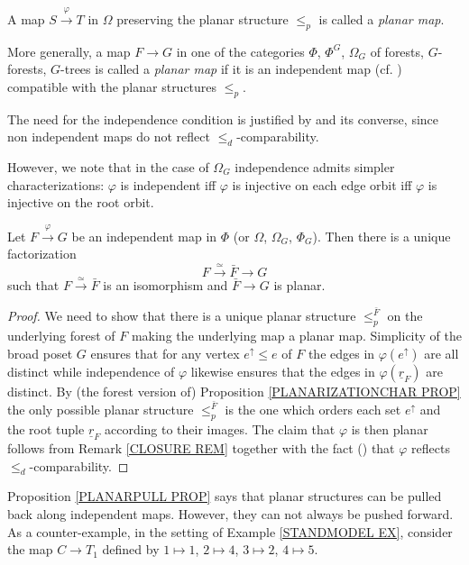 \documentclass[a4paper,10pt]{article}%
\begin{document}
\begin{definition}
      \label{PLANARMAP_DEF}
	A map $S \xrightarrow{\varphi} T$ in $\Omega$ preserving the planar structure $\leq_p$
	is called a \textit{planar map}.
	
	More generally, a map $F \to G$ in one of the categories $\Phi$, $\Phi^G$, $\Omega_G$ of forests, $G$-forests, $G$-trees is called a \textit{planar map} if it is an independent map (cf. \cite[Def. 5.28]{Pe17}) compatible with the planar structures $\leq_p$.
\end{definition}


\begin{remark}
	The need for the independence condition is justified by \cite[Lemma 5.33]{Pe17} and its converse, since non independent maps do not reflect $\leq_d$-comparability.
 
However, we note that in the case of $\Omega_G$
independence admits simpler characterizations:
$\varphi$ is independent iff $\varphi$ is injective on each edge orbit iff $\varphi$ is injective on the root orbit.
\end{remark}


\begin{proposition}
\label{PLANARPULL PROP}
	Let $F \xrightarrow{\varphi} G$ be an independent map in $\Phi$ (or $\Omega$, $\Omega_G$, $\Phi_G$). Then there is a unique factorization 
	\[F \xrightarrow{\simeq} \bar{F} \to G\]
	such that $F \xrightarrow{\simeq} \bar{F}$ is an isomorphism and $\bar{F} \to G$ is planar.
\end{proposition}

\begin{proof}
We need to show that there is a unique planar structure 
$\leq_p^{\bar{F}}$ on the underlying forest of $F$ making the underlying map a planar map.
Simplicity of the broad poset $G$ ensures that for any vertex $e^{\uparrow} \leq e$ of $F$ the edges in $\varphi(e^{\uparrow})$ are all distinct while independence of $\varphi$ likewise ensures that the edges in $\varphi(\underline{r}_F)$ are distinct.
By (the forest version of) Proposition
\ref{PLANARIZATIONCHAR PROP}
the only possible planar structure $\leq_p^{\bar{F}}$
is the one which orders each set $e^{\uparrow}$ and the root tuple $\underline{r}_F$ according to their images.
The claim that $\varphi$ is then planar follows from 
Remark \ref{CLOSURE REM}
together with the fact (\cite[Lemma 5.33]{Pe17})
that $\varphi$ reflects $\leq_d$-comparability.
\end{proof}


\begin{remark}\label{PULLPLANAR REM}
Proposition \ref{PLANARPULL PROP} says that planar structures can be pulled back along independent maps. However, they can not always be pushed forward. As a counter-example, in the setting of Example \ref{STANDMODEL EX}, consider the map $C \to T_1$ defined by $1 \mapsto 1$, $2 \mapsto 4$, $3 \mapsto 2$, $4 \mapsto 5$.
\end{remark}
\end{document}
